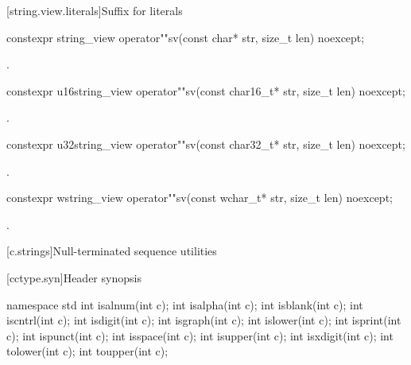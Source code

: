 [string.view.literals]{Suffix for  literals}

%
\begin{itemdecl}
constexpr string_view operator""sv(const char* str, size_t len) noexcept;
\end{itemdecl}

\begin{itemdescr}
\pnum
\returns
{}.
\end{itemdescr}

%
\begin{itemdecl}
constexpr u16string_view operator""sv(const char16_t* str, size_t len) noexcept;
\end{itemdecl}
\begin{itemdescr}
\pnum
\returns
{}.
\end{itemdescr}

%
\begin{itemdecl}
constexpr u32string_view operator""sv(const char32_t* str, size_t len) noexcept;
\end{itemdecl}
\begin{itemdescr}
\pnum
\returns
{}.
\end{itemdescr}

%
\begin{itemdecl}
constexpr wstring_view operator""sv(const wchar_t* str, size_t len) noexcept;
\end{itemdecl}
\begin{itemdescr}
\pnum
\returns
{}.
\end{itemdescr}


[c.strings]{Null-terminated sequence utilities}

[cctype.syn]{Header  synopsis}

%
%
%
%
%
%
%
%
%
%
%
%
%
%
%
\begin{codeblock}
namespace std {
  int isalnum(int c);
  int isalpha(int c);
  int isblank(int c);
  int iscntrl(int c);
  int isdigit(int c);
  int isgraph(int c);
  int islower(int c);
  int isprint(int c);
  int ispunct(int c);
  int isspace(int c);
  int isupper(int c);
  int isxdigit(int c);
  int tolower(int c);
  int toupper(int c);
}
\end{codeblock}

